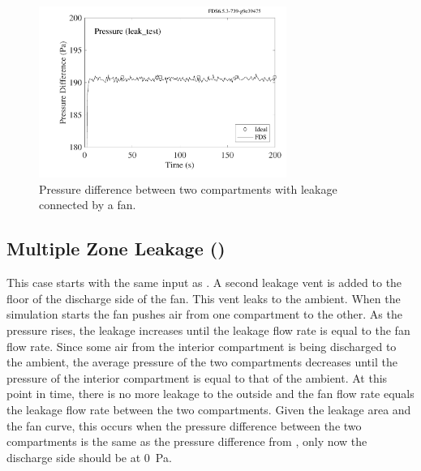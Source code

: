 \documentclass[11pt]{book}
\begin{document}
\begin{figure}[ht]
\centering
\includegraphics[height=2.2in]{SCRIPT_FIGURES/leak_test}
\caption[The  case]{Pressure difference between two compartments with leakage connected by a fan.}
\label{leak_test_fig}
\end{figure}

\subsection{Multiple Zone Leakage (\texorpdfstring{}{leak\_test\_2})}
\label{leak_test_2}

This case starts with the same input as .  A second leakage vent is added to the floor of the discharge side of the fan.  This vent leaks to the ambient.  When the simulation starts the fan pushes air from one compartment to the other. As the pressure rises, the leakage increases until the leakage flow rate is equal to the fan flow rate. Since some air from the interior compartment is being discharged to the ambient, the average pressure of the two compartments decreases until the pressure of the interior compartment is equal to that of the ambient. At this point in time, there is no more leakage to the outside and the fan flow rate equals the leakage flow rate between the two compartments.  Given the leakage area and the fan curve, this occurs when the pressure difference between the two compartments is the same as the pressure difference from , only now the discharge side should be at 0~Pa.
\end{document}
